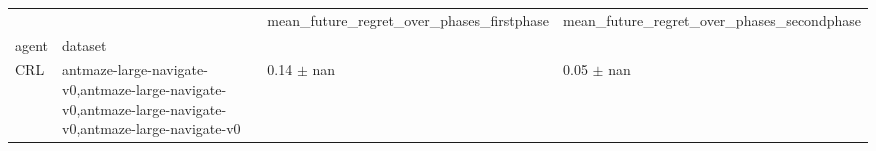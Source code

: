 \begin{tabular}{llll}
\toprule
 &  & mean_future_regret_over_phases_firstphase & mean_future_regret_over_phases_secondphase \\
agent & dataset &  &  \\
\midrule
CRL & antmaze-large-navigate-v0,antmaze-large-navigate-v0,antmaze-large-navigate-v0,antmaze-large-navigate-v0 & 0.14 $\pm$ nan & 0.05 $\pm$ nan \\
\cline{1-4}
\bottomrule
\end{tabular}
